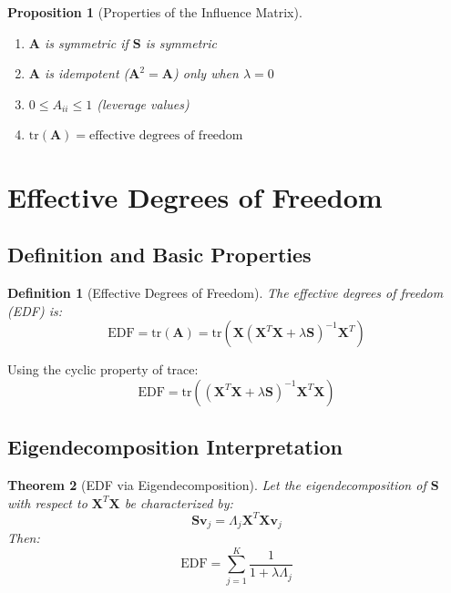 \documentclass[12pt]{article}
\newtheorem{theorem}{Theorem}
\newtheorem{proposition}[theorem]{Proposition}
\newtheorem{definition}{Definition}
\newcommand{\tr}{\text{tr}}
\begin{document}
\begin{proposition}[Properties of the Influence Matrix]
\begin{enumerate}
    \item $\mathbf{A}$ is symmetric if $\mathbf{S}$ is symmetric
    \item $\mathbf{A}$ is idempotent ($\mathbf{A}^2 = \mathbf{A}$) only when $\lambda = 0$
    \item $0 \leq A_{ii} \leq 1$ (leverage values)
    \item $\tr(\mathbf{A}) = \text{effective degrees of freedom}$
\end{enumerate}
\end{proposition}

\section{Effective Degrees of Freedom}

\subsection{Definition and Basic Properties}

\begin{definition}[Effective Degrees of Freedom]
The effective degrees of freedom (EDF) is:
\begin{equation}
\text{EDF} = \tr(\mathbf{A}) = \tr\left(\mathbf{X}(\mathbf{X}^T\mathbf{X} + \lambda\mathbf{S})^{-1}\mathbf{X}^T\right)
\end{equation}
\end{definition}

Using the cyclic property of trace:
\begin{equation}
\text{EDF} = \tr\left((\mathbf{X}^T\mathbf{X} + \lambda\mathbf{S})^{-1}\mathbf{X}^T\mathbf{X}\right)
\end{equation}

\subsection{Eigendecomposition Interpretation}

\begin{theorem}[EDF via Eigendecomposition]
Let the eigendecomposition of $\mathbf{S}$ with respect to $\mathbf{X}^T\mathbf{X}$ be characterized by:
\begin{equation}
\mathbf{S}\mathbf{v}_j = \Lambda_j \mathbf{X}^T\mathbf{X}\mathbf{v}_j
\end{equation}
Then:
\begin{equation}
\text{EDF} = \sum_{j=1}^K \frac{1}{1 + \lambda \Lambda_j}
\end{equation}
\end{theorem}
\end{document}
